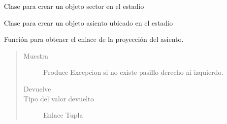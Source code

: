 \documentclass[letterpaper,10pt,spanish]{sphinxmanual}
\begin{document}
\begin{fulllineitems}
\label{\detokenize{Clases:Clases.Sector}}
\sphinxAtStartPar
Clase para crear un objeto sector en el estadio

\end{fulllineitems}


\begin{fulllineitems}
\label{\detokenize{Clases:Clases.Asiento}}
\sphinxAtStartPar
Clase para crear un objeto asiento ubicado en el estadio

\begin{fulllineitems}
\label{\detokenize{Clases:Clases.Asiento.enlaceProyeccion}}
\sphinxAtStartPar
Función para obtener el enlace de la proyección del asiento.
\begin{quote}\begin{description}
\item[{Muestra}] \leavevmode
\sphinxAtStartPar
{} \textendash{} Produce Excepcion si no existe pasillo derecho ni izquierdo.

\item[{Devuelve}] \leavevmode
\sphinxAtStartPar


\item[{Tipo del valor devuelto}] \leavevmode
\sphinxAtStartPar
Enlace \sphinxhyphen{} Tupla

\end{description}\end{quote}

\end{fulllineitems}


\end{fulllineitems}
\end{document}
